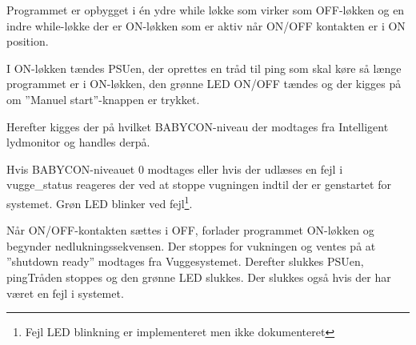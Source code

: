 Programmet er opbygget i én ydre while løkke som virker som OFF-løkken og en indre while-løkke der er ON-løkken som er aktiv når ON/OFF kontakten er i ON position.


I ON-løkken tændes PSUen, der oprettes en tråd til ping som skal køre så længe programmet er i ON-løkken, den grønne LED ON/OFF tændes og der kigges på om ''Manuel start''-knappen er trykket.


Herefter kigges der på hvilket BABYCON-niveau der modtages fra Intelligent lydmonitor og handles derpå.


Hvis BABYCON-niveauet 0 modtages eller hvis der udlæses en fejl i vugge\_status reageres der ved at stoppe vugningen indtil der er genstartet for systemet. Grøn LED blinker ved fejl\footnote{Fejl LED blinkning er implementeret men ikke dokumenteret}.


Når ON/OFF-kontakten sættes i OFF, forlader programmet ON-løkken og begynder nedlukningssekvensen. Der stoppes for vukningen og ventes på at ''shutdown ready'' modtages fra Vuggesystemet. Derefter slukkes PSUen, pingTråden stoppes og den grønne LED slukkes. Der slukkes også hvis der har været en fejl i systemet.


